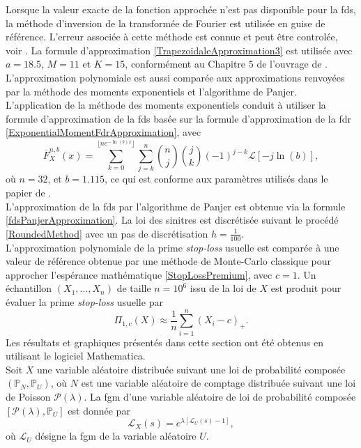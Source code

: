 Lorsque la valeur exacte de la fonction approchée n\rq{}est pas disponible pour la \gls{fds}, la méthode d\rq{}inversion de la transformée de Fourier est utilisée en guise de référence. L\rq{}erreur associée à cette méthode est connue et peut être controlée, voir \citet{AbWh92}. La formule d\rq{}approximation \eqref{TrapezoidaleApproximation3} est utilisée avec $a=18.5$, $M=11$ et $K=15$, conformément au Chapitre $5$ de l\rq{}ouvrage de \citet{RoScScTe99}. L\rq{}approximation polynomiale est aussi comparée aux approximations renvoyées par la méthode des moments exponentiels et l\rq{}algorithme de Panjer.\\

L\rq{}application de la méthode des moments exponentiels conduit à utiliser la formule d\rq{}approximation de la \gls{fds} basée sur la formule d\rq{}approximation de la \gls{fdr} \eqref{ExponentialMomentFdrApproximation}, avec 
\begin{equation}\label{ExponentialMomentFdrApproximation}
\overline{F}_{X}^{n,b}(x)=\sum^{\lfloor{ne^{-\ln(b)x}}\rfloor}_{k=0}\sum_{j=k}^{n}\binom{n}{j}\binom{j}{k}(-1)^{j-k}\mathcal{L}\left[-j\ln(b)\right],
\end{equation}
où $n=32$, et $b=1.115$, ce qui est conforme aux paramètres utilisés dans le papier de \citet{MnSa13}.\\

L\rq{}approximation de la \gls{fds} par l\rq{}algorithme de Panjer est obtenue via la formule \eqref{fdsPanjerApproximation}. La loi des sinitres est discrétisée suivant le procédé \eqref{RoundedMethod} avec un pas de discrétisation $h=\frac{1}{100}$.\\

L\rq{}approximation polynomiale de la prime \textit{stop-loss} usuelle est comparée à une valeur de référence obtenue par une méthode de Monte-Carlo classique pour approcher l\rq{}espérance mathématique \eqref{StopLossPremium}, avec $c=1$. Un échantillon $(X_{1},\ldots,X_{n})$ de taille $n=10^{6}$ issu de la loi de $X$ est produit pour évaluer la prime \textit{stop-loss} usuelle par 
\begin{equation*}
\Pi_{1,c}(X)\approx\frac{1}{n}\sum_{i=1}^{n}\left(X_{i}-c\right)_{+}.
\end{equation*}
Les résultats et graphiques présentés dans cette section ont été obtenus en utilisant le logiciel Mathematica.\\

Soit $X$ une variable aléatoire distribuée suivant une loi de probabilité composée $(\mathbb{P}_{N},\mathbb{P}_{U})$, où $N$ est une variable aléatoire de comptage distribuée suivant une loi de Poisson $\mathcal{P}(\lambda)$. La \gls{fgm} d'une variable aléatoire de loi de probabilité composée $\left[\mathcal{P}(\lambda),\mathbb{P}_{U}\right]$ est donnée par 
\begin{equation}\label{fgmCompoundPoisson}
\mathcal{L}_{X}(s)=e^{\lambda\left[\mathcal{L}_{U}(s)-1\right]},
\end{equation}
où $\mathcal{L}_{U}$ désigne la \gls{fgm} de la variable aléatoire $U$.
